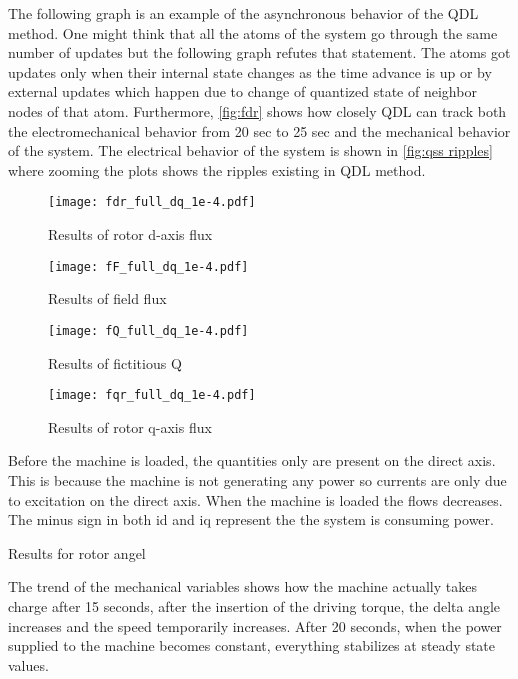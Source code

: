 \documentclass{article}
\theoremstyle{scsthe}
\begin{document}
The following graph is an example of the asynchronous behavior of the QDL method. One might think that all the atoms of the system go through the same number of updates but the following graph refutes that statement. The atoms got updates only when their internal state changes as the time advance is up or by external updates which happen due to change of quantized state of neighbor nodes of that atom. Furthermore, \autoref{fig:fdr} shows how closely QDL can track both the electromechanical behavior from 20 sec to 25 sec and the mechanical behavior of the system. The electrical behavior of the system is shown in \autoref{fig:qss ripples} where zooming the plots shows the ripples existing in QDL method. 

 \begin{figure}[H]
 \FloatBarrier
    \centering
    \texttt{[image: fdr\_full\_dq\_1e-4.pdf]}
    \caption{Results of rotor d-axis flux}
    \label{fig:fdr}
\end{figure}

 \begin{figure}[H]
 \FloatBarrier
    \centering
    \texttt{[image: fF\_full\_dq\_1e-4.pdf]}
    \caption{Results of field flux}
    \label{fig:filed current flux}
\end{figure}


 \begin{figure}[H]
 \FloatBarrier
    \centering
    \texttt{[image: fQ\_full\_dq\_1e-4.pdf]}
    \caption{Results of fictitious Q}
    \label{fig:fQ}
\end{figure}

 \begin{figure}[H]
 \FloatBarrier
    \centering
    \texttt{[image: fqr\_full\_dq\_1e-4.pdf]}
    \caption{Results of rotor q-axis flux}
    \label{fig:fqr}
\end{figure}

Before the machine is loaded, the quantities only are present on the direct axis. This is because the machine is not generating any power so currents are only due to excitation on the direct axis. When the machine is loaded the flows decreases. The minus sign in both id and iq represent the the system is consuming power. 

Results for rotor angel

The trend of the mechanical variables shows how the machine actually takes charge after 15 seconds, after the insertion of the driving torque, the delta angle increases and the speed temporarily increases. After 20 seconds, when the power supplied to the machine becomes constant, everything stabilizes at steady state values.
\end{document}
